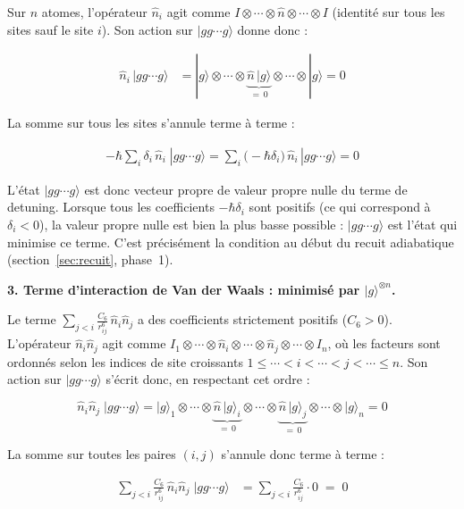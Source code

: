 \documentclass{ceri/sty/rapport}
\begin{document}
Sur $n$ atomes, l'opérateur $\hat{n}_i$ agit comme $I\otimes\cdots\otimes\hat{n}\otimes\cdots\otimes I$
(identité sur tous les sites sauf le site $i$). Son action sur $|gg\cdots g\rangle$ donne donc :

\begin{align}
\hat{n}_i\,|gg\cdots g\rangle
&= |g\rangle\otimes\cdots\otimes\underbrace{\hat{n}\,|g\rangle}_{=\,0}\otimes\cdots\otimes|g\rangle
= 0
\end{align}

La somme sur tous les sites s'annule terme à terme :

\begin{align}
-\hbar\sum_i\delta_i\,\hat{n}_i\;|gg\cdots g\rangle
= \sum_i\big(-\hbar\delta_i\big)\,\hat{n}_i\,|gg\cdots g\rangle
= 0
\end{align}

L'état $|gg\cdots g\rangle$ est donc vecteur propre de valeur propre nulle du terme de detuning.
Lorsque tous les coefficients $-\hbar\delta_i$ sont positifs (ce qui correspond à $\delta_i < 0$),
la valeur propre nulle est bien la plus basse possible : $|gg\cdots g\rangle$ est l'état qui
minimise ce terme. C'est précisément la condition au début du recuit adiabatique
(section~\ref{sec:recuit}, phase~1).

\medskip
\noindent\textbf{3. Terme d'interaction de Van der Waals : minimisé par $|g\rangle^{\otimes n}$.}

Le terme $\sum_{j<i}\frac{C_6}{r_{ij}^6}\,\hat{n}_i\hat{n}_j$ a des coefficients strictement
positifs ($C_6 > 0$). L'opérateur $\hat{n}_i\hat{n}_j$ agit comme
$I_1\otimes\cdots\otimes\hat{n}_i\otimes\cdots\otimes\hat{n}_j\otimes\cdots\otimes I_n$,
où les facteurs sont ordonnés selon les indices de site croissants $1 \le \cdots < i < \cdots < j < \cdots \le n$.
Son action sur $|gg\cdots g\rangle$ s'écrit donc, en respectant cet ordre :

\begin{equation}
\hat{n}_i\hat{n}_j\;|gg\cdots g\rangle
= |g\rangle_1 \otimes \cdots \otimes \underbrace{\hat{n}\,|g\rangle_i}_{=\,0}
  \otimes \cdots \otimes \underbrace{\hat{n}\,|g\rangle_j}_{=\,0}
  \otimes \cdots \otimes |g\rangle_n
= 0
\end{equation}

La somme sur toutes les paires $(i,j)$ s'annule donc terme à terme :

\begin{align}
\sum_{j<i}\frac{C_6}{r_{ij}^6}\,\hat{n}_i\hat{n}_j\;|gg\cdots g\rangle
&= \sum_{j<i}\frac{C_6}{r_{ij}^6} \cdot 0 \;=\; 0
\end{align}
\end{document}
